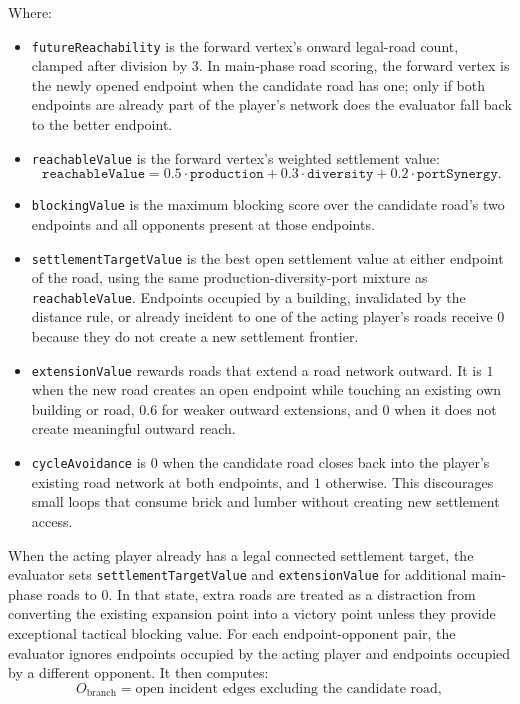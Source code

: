 \documentclass{article}
\begin{document}
Where:
\begin{itemize}
    \item \texttt{futureReachability} is the forward vertex's onward legal-road count, clamped after division by $3$. In main-phase road scoring, the forward vertex is the newly opened endpoint when the candidate road has one; only if both endpoints are already part of the player's network does the evaluator fall back to the better endpoint.
    \item \texttt{reachableValue} is the forward vertex's weighted settlement value:
    \[
    \texttt{reachableValue}
    = 0.5 \cdot \texttt{production}
    + 0.3 \cdot \texttt{diversity}
    + 0.2 \cdot \texttt{portSynergy}.
    \]
    \item \texttt{blockingValue} is the maximum blocking score over the candidate road's two endpoints and all opponents present at those endpoints.
    \item \texttt{settlementTargetValue} is the best open settlement value at either endpoint of the road, using the same production-diversity-port mixture as \texttt{reachableValue}. Endpoints occupied by a building, invalidated by the distance rule, or already incident to one of the acting player's roads receive $0$ because they do not create a new settlement frontier.
    \item \texttt{extensionValue} rewards roads that extend a road network outward. It is $1$ when the new road creates an open endpoint while touching an existing own building or road, $0.6$ for weaker outward extensions, and $0$ when it does not create meaningful outward reach.
    \item \texttt{cycleAvoidance} is $0$ when the candidate road closes back into the player's existing road network at both endpoints, and $1$ otherwise. This discourages small loops that consume brick and lumber without creating new settlement access.
\end{itemize}
When the acting player already has a legal connected settlement target, the evaluator sets \texttt{settlementTargetValue} and \texttt{extensionValue} for additional main-phase roads to $0$. In that state, extra roads are treated as a distraction from converting the existing expansion point into a victory point unless they provide exceptional tactical blocking value.
For each endpoint-opponent pair, the evaluator ignores endpoints occupied by the acting player and endpoints occupied by a different opponent. It then computes:
\[
O_{\text{branch}} =
\text{open incident edges excluding the candidate road},
\]
\end{document}
